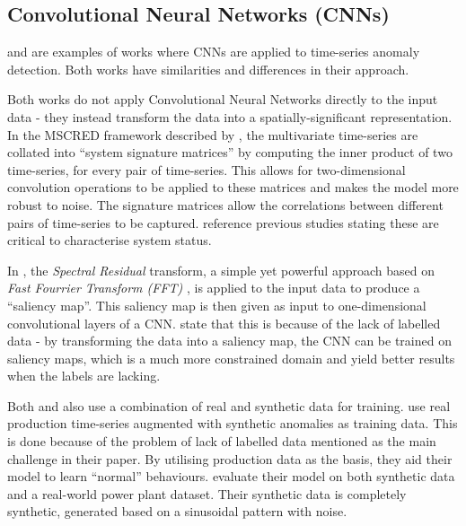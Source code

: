 \documentclass{mpaper}
\begin{document}
\subsection{Convolutional Neural Networks (CNNs)}
\label{section:cnn}

\cite{deepMultivariateNetwork} and \cite{MicrosoftTimeSeries} are examples of works where CNNs are applied to time-series anomaly detection. Both works have similarities and differences in their approach.

Both works do not apply Convolutional Neural Networks directly to the input data - they instead transform the data into a spatially-significant representation.
In the MSCRED framework described by \cite{deepMultivariateNetwork}, the multivariate time-series are collated into ``system signature matrices'' by computing the inner product of two time-series, for every pair of time-series. This allows for two-dimensional convolution operations to be applied to these matrices and makes the model more robust to noise. The signature matrices allow the correlations between different pairs of time-series to be captured. \cite{deepMultivariateNetwork} reference previous studies stating these are critical to characterise system status.

In \cite{MicrosoftTimeSeries}, the \textit{Spectral Residual} transform, a simple yet powerful approach based on \textit{Fast Fourrier Transform (FFT)} \citep{MicrosoftTimeSeries}, is applied to the input data to produce a ``saliency map''. This saliency map is then given as input to one-dimensional convolutional layers of a CNN. \cite{MicrosoftTimeSeries} state that this is because of the lack of labelled data - by transforming the data into a saliency map, the CNN can be trained on saliency maps, which is a much more constrained domain and yield better results when the labels are lacking.

Both \cite{deepMultivariateNetwork} and \cite{MicrosoftTimeSeries} also use a combination of real and synthetic data for training. 
\cite{MicrosoftTimeSeries} use real production time-series augmented with synthetic anomalies as training data. This is done because of the problem of lack of labelled data mentioned as the main challenge in their paper. By utilising production data as the basis, they aid their model to learn ``normal'' behaviours.
\cite{deepMultivariateNetwork} evaluate their model on both synthetic data and a real-world power plant dataset. Their synthetic data is completely synthetic, generated based on a sinusoidal pattern with noise.
\end{document}
